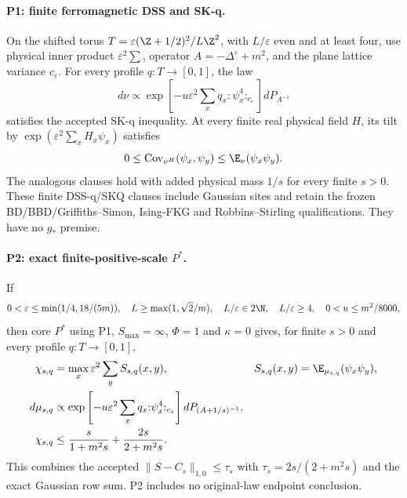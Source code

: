 \paragraph{P1: finite ferromagnetic DSS and SK-q.}
On the shifted torus
$T=\varepsilon(\Z+1/2)^2/L\Z^2$, with $L/\varepsilon$ even and at least
four, use physical inner product $\varepsilon^2\sum$, operator
$A=-\Delta^\varepsilon+m^2$, and the plane lattice variance
$c_\varepsilon$. For every profile $q:T\to[0,1]$, the law
\[
 d\nu\propto\exp\left[-u\varepsilon^2\sum_xq_x
                {:}\psi_x^4{:}_{c_\varepsilon}\right]dP_{A^{-1}}
\]
satisfies the accepted SK-q inequality. At every finite real physical
field $H$, its tilt by $\exp(\varepsilon^2\sum_xH_x\psi_x)$ satisfies
\[
 0\le\operatorname{Cov}_{\nu^H}(\psi_x,\psi_y)
       \le\E_\nu(\psi_x\psi_y).
\]
The analogous clauses hold with added physical mass $1/s$ for every finite
$s>0$. These finite DSS-q/SKQ clauses include Gaussian sites and retain the
frozen BD/BBD/Griffiths--Simon, Ising-FKG and Robbins--Stirling
qualifications. They have no $g_*$ premise.

\paragraph{P2: exact finite-positive-scale $P^*$.}
If
\[
 0<\varepsilon\le\min(1/4,18/(5m)),\quad
 L\ge\max(1,\sqrt2/m),\quad L/\varepsilon\in2\N,\quad
 L/\varepsilon\ge4,\quad0<u\le m^2/8000,
\]
then core $P^*$ using P1, $S_{\max}=\infty$, $\Phi=1$ and $\kappa=0$
gives, for finite $s>0$ and every profile $q:T\to[0,1]$,
\begin{align*}
 \chi_{s,q}&=\max_x\varepsilon^2\sum_y S_{s,q}(x,y),&
 S_{s,q}(x,y)&=\E_{\mu_{s,q}}(\psi_x\psi_y),\\
 d\mu_{s,q}&\propto\exp\left[-u\varepsilon^2\sum_xq_x
                 {:}\psi_x^4{:}_{c_\varepsilon}\right]dP_{(A+1/s)^{-1}},\\
 \chi_{s,q}&\le\frac{s}{1+m^2s}+\frac{2s}{2+m^2s}.
\end{align*}
This combines the accepted $\|S-C_s\|_{1,0}\le\tau_s$ with
$\tau_s=2s/(2+m^2s)$ and the exact Gaussian row sum. P2 includes no
original-law endpoint conclusion.

